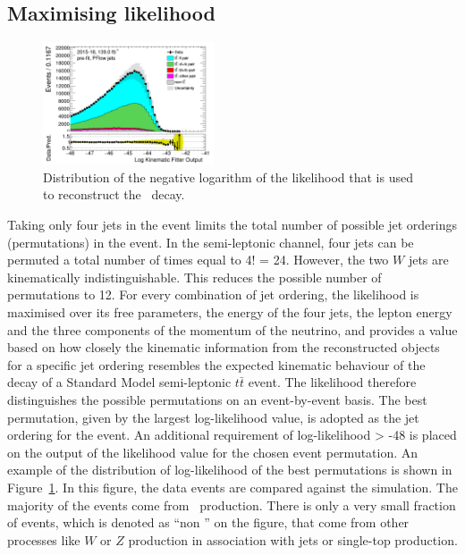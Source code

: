 \documentclass[letterpaper,12pt]{article}
\begin{document}
\subsection{Maximising likelihood}
\label{maximise likelihood}
\begin{figure}[!h]
	\centering
	\includegraphics[width=0.45\textwidth]{FTAG_plots/pretagNoRwwithhighpTPFlowall/DataMC_h_LLR.png}
	\caption{Distribution of  the negative logarithm of the likelihood that
	is used to reconstruct the \ttbar\ decay.}
	\label{fig:llr}
\end{figure}

Taking only four jets in the event limits the total number of possible 
jet orderings (permutations) in the event. In the semi-leptonic channel, 
four jets can be permuted a total number of times equal to 4! = 24. 
However, the two $W$ jets are kinematically indistinguishable. 
This reduces the possible number of permutations to 12. 
For every combination of jet ordering, 
the likelihood is maximised over 
its free parameters, the energy of the four jets, the lepton energy and 
the three components of the momentum of the neutrino, and provides a 
value based on how closely the kinematic information from the reconstructed 
objects for a specific jet ordering resembles the expected kinematic behaviour 
of the decay of a Standard Model semi-leptonic $t\bar{t}$ event. The likelihood 
therefore distinguishes the possible permutations on an event-by-event basis. 
The best permutation, given by the largest log-likelihood value, is adopted 
as the jet ordering for the event. 
An additional requirement of log-likelihood > -48 is 
placed on the output of the likelihood value for the chosen event permutation. 
An example of the distribution of log-likelihood of the best permutations 
is shown in Figure~\ref{fig:llr}. 
In this figure, the data events are compared against the simulation.
The majority of the events come from \ttbar\ production. There is only
a very small fraction of events, which is denoted as ``non \ttbar''
on the figure, that come from other processes like $W$ or $Z$ production
in association with jets or single-top production.
\end{document}
